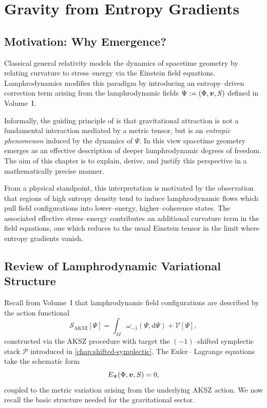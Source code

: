 \chapter{Gravity from Entropy Gradients}
\label{chap:gravity}

\section{Motivation: Why Emergence?}

Classical general relativity models the dynamics of spacetime geometry by
relating curvature to stress--energy via the Einstein field equations.
Lamphrodynamics modifies this paradigm by introducing an entropy--driven
correction term arising from the lamphrodynamic fields
$\Psi := (\Phi,\bm{v},S)$ defined in Volume~I.

Informally, the guiding principle of \rsvpabbr{} is that gravitational
attraction is not a fundamental interaction mediated by a metric tensor, but is
an \emph{entropic phenomenon} induced by the dynamics of $\Psi$. In this view
spacetime geometry emerges as an effective description of deeper lamphrodynamic
degrees of freedom. The aim of this chapter is to explain, derive, and justify
this perspective in a mathematically precise manner.

From a physical standpoint, this interpretation is motivated by the observation
that regions of high entropy density tend to induce lamphrodynamic flows which
pull field configurations into lower--energy, higher--coherence states. The
associated effective stress--energy contributes an additional curvature
term in the field equations, one which reduces to the usual Einstein tensor in
the limit where entropy gradients vanish.

\section{Review of Lamphrodynamic Variational Structure}

Recall from Volume~I that lamphrodynamic field configurations are described by
the action functional
\[
  \mathcal{S}_{\mathrm{AKSZ}}[\Psi]
  = \int_M \omega_{-1}(\Psi, \mathrm{d}\Psi) + \mathcal{V}[\Psi],
\]
constructed via the AKSZ procedure with target the $(-1)$–shifted symplectic
stack $\mathcal{P}$ introduced in \cref{chap:shifted-symplectic}. The Euler--%
Lagrange equations take the schematic form
\[
  E_\Psi(\Phi,\bm{v},S) = 0,
\]
coupled to the metric variation arising from the underlying AKSZ action. We
now recall the basic structure needed for the gravitational sector.

